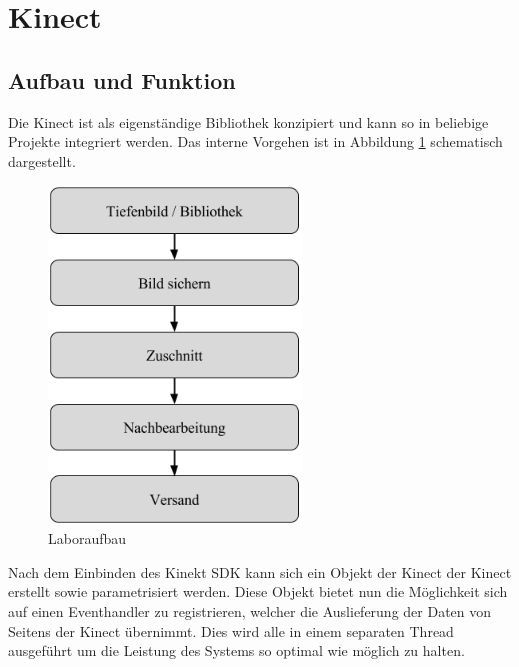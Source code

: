 \section{Kinect}
\begin{Spacing}{\mylinespace}

\subsection{Aufbau und Funktion}

Die Kinect ist als eigenständige Bibliothek konzipiert und kann so in beliebige Projekte integriert werden. Das interne Vorgehen ist in Abbildung \ref{fig:kinectdll} schematisch dargestellt. 

\begin{figure}[hbtp]
	\vspace{0.2cm}
	\centering
	\includegraphics[width=0.6\textwidth]{graphics/block_dll.png}
	\caption{Laboraufbau}
	\label{fig:kinectdll}
\end{figure}

Nach dem Einbinden des Kinekt SDK kann sich ein Objekt der Kinect der Kinect erstellt sowie parametrisiert werden. Diese Objekt bietet nun die Möglichkeit sich auf einen Eventhandler zu registrieren, welcher die Auslieferung der Daten von Seitens der Kinect übernimmt. Dies wird alle in einem separaten Thread ausgeführt um die Leistung des Systems so optimal wie möglich zu halten.


\end{Spacing}
